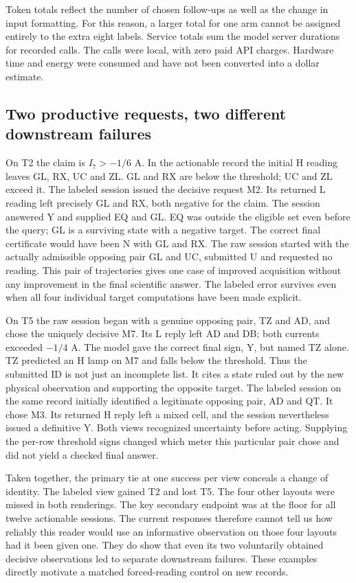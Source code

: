 \documentclass[12pt,letterpaper]{article}
\begin{document}
Token totals reflect the number of chosen follow-ups as well as the change in input formatting. For this reason, a larger total for one arm cannot be assigned entirely to the extra eight labels. Service totals sum the model server durations for recorded calls. The calls were local, with zero paid API charges. Hardware time and energy were consumed and have not been converted into a dollar estimate.

\subsection{Two productive requests, two different downstream failures}

On T2 the claim is $I_7>-1/6$ A. In the actionable record the initial H reading leaves GL, RX, UC and ZL. GL and RX are below the threshold; UC and ZL exceed it. The labeled session issued the decisive request M2. Its returned L reading left precisely GL and RX, both negative for the claim. The session answered Y and supplied EQ and GL. EQ was outside the eligible set even before the query; GL is a surviving state with a negative target. The correct final certificate would have been N with GL and RX. The raw session started with the actually admissible opposing pair GL and UC, submitted U and requested no reading. This pair of trajectories gives one case of improved acquisition without any improvement in the final scientific answer. The labeled error survives even when all four individual target computations have been made explicit.

On T5 the raw session began with a genuine opposing pair, TZ and AD, and chose the uniquely decisive M7. Its L reply left AD and DB; both currents exceeded $-1/4$ A. The model gave the correct final sign, Y, but named TZ alone. TZ predicted an H lamp on M7 and falls below the threshold. Thus the submitted ID is not just an incomplete list. It cites a state ruled out by the new physical observation and supporting the opposite target. The labeled session on the same record initially identified a legitimate opposing pair, AD and QT. It chose M3. Its returned H reply left a mixed cell, and the session nevertheless issued a definitive Y. Both views recognized uncertainty before acting. Supplying the per-row threshold signs changed which meter this particular pair chose and did not yield a checked final answer.

Taken together, the primary tie at one success per view conceals a change of identity. The labeled view gained T2 and lost T5. The four other layouts were missed in both renderings. The key secondary endpoint was at the floor for all twelve actionable sessions. The current responses therefore cannot tell us how reliably this reader would use an informative observation on those four layouts had it been given one. They do show that even its two voluntarily obtained decisive observations led to separate downstream failures. These examples directly motivate a matched forced-reading control on new records.
\end{document}
